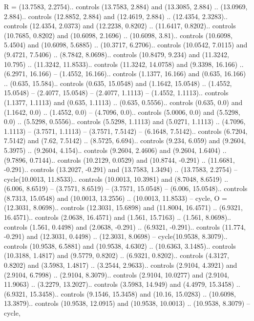 {R} = {(13.7583, 2.2754).. controls (13.7583, 2.884) and (13.3085, 2.884) .. (13.0969, 2.884).. controls (12.8852, 2.884) and (12.4619, 2.884) .. (12.4354, 2.3283).. controls (12.4354, 2.0373) and (12.2238, 0.8202) .. (11.6417, 0.8202).. controls (10.7685, 0.8202) and (10.6098, 2.1696) .. (10.6098, 3.81).. controls (10.6098, 5.4504) and (10.6098, 5.6885) .. (10.3717, 6.2706).. controls (10.0542, 7.0115) and (9.4721, 7.5406) .. (8.7842, 8.0698).. controls (10.8479, 9.234) and (11.3242, 10.795) .. (11.3242, 11.8533).. controls (11.3242, 14.0758) and (9.3398, 16.166) .. (6.2971, 16.166) -- (1.4552, 16.166).. controls (1.1377, 16.166) and (0.635, 16.166) .. (0.635, 15.584).. controls (0.635, 15.0548) and (1.1642, 15.0548) .. (1.4552, 15.0548) -- (2.4077, 15.0548) -- (2.4077, 1.1113) -- (1.4552, 1.1113).. controls (1.1377, 1.1113) and (0.635, 1.1113) .. (0.635, 0.5556).. controls (0.635, 0.0) and (1.1642, 0.0) .. (1.4552, 0.0) -- (4.7096, 0.0).. controls (5.0006, 0.0) and (5.5298, 0.0) .. (5.5298, 0.5556).. controls (5.5298, 1.1113) and (5.0271, 1.1113) .. (4.7096, 1.1113) -- (3.7571, 1.1113) -- (3.7571, 7.5142) -- (6.1648, 7.5142).. controls (6.7204, 7.5142) and (7.62, 7.5142) .. (8.5725, 6.694).. controls (9.234, 6.059) and (9.2604, 5.3975) .. (9.2604, 4.154).. controls (9.2604, 2.4606) and (9.2604, 1.6404) .. (9.7896, 0.7144).. controls (10.2129, 0.0529) and (10.8744, -0.291) .. (11.6681, -0.291).. controls (13.2027, -0.291) and (13.7583, 1.3494) .. (13.7583, 2.2754) -- cycle(10.0013, 11.8533).. controls (10.0013, 10.3981) and (8.7048, 8.6519) .. (6.006, 8.6519) -- (3.7571, 8.6519) -- (3.7571, 15.0548) -- (6.006, 15.0548).. controls (8.7313, 15.0548) and (10.0013, 13.2556) .. (10.0013, 11.8533) -- cycle},
{O} = {(12.3031, 8.0698).. controls (12.3031, 15.6898) and (11.8004, 16.4571) .. (6.9321, 16.4571).. controls (2.0638, 16.4571) and (1.561, 15.7163) .. (1.561, 8.0698).. controls (1.561, 0.4498) and (2.0638, -0.291) .. (6.9321, -0.291).. controls (11.774, -0.291) and (12.3031, 0.4498) .. (12.3031, 8.0698) -- cycle(10.9538, 8.3079).. controls (10.9538, 6.5881) and (10.9538, 4.6302) .. (10.6363, 3.1485).. controls (10.3188, 1.4817) and (9.5779, 0.8202) .. (6.9321, 0.8202).. controls (4.3127, 0.8202) and (3.5983, 1.4817) .. (3.2544, 2.9633).. controls (2.9104, 4.3921) and (2.9104, 6.7998) .. (2.9104, 8.3079).. controls (2.9104, 10.0277) and (2.9104, 11.9063) .. (3.2279, 13.2027).. controls (3.5983, 14.949) and (4.4979, 15.3458) .. (6.9321, 15.3458).. controls (9.1546, 15.3458) and (10.16, 15.0283) .. (10.6098, 13.3879).. controls (10.9538, 12.0915) and (10.9538, 10.0013) .. (10.9538, 8.3079) -- cycle},
